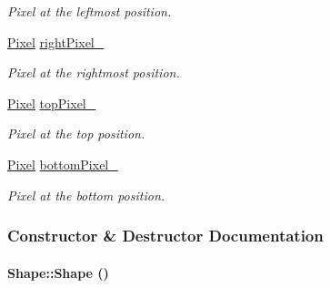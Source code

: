 \begin{CompactItemize}
\begin{CompactList}\small\item\em Pixel at the leftmost position. \item\end{CompactList}\item 
\hypertarget{class_shape_16adfccce492a7a0e34c5ade941c32fd}{
\hyperlink{_pixel_8hpp_535e59456e3e633842529cfa8ea103c4}{Pixel} \hyperlink{class_shape_16adfccce492a7a0e34c5ade941c32fd}{rightPixel\_\-}}
\label{class_shape_16adfccce492a7a0e34c5ade941c32fd}

\begin{CompactList}\small\item\em Pixel at the rightmost position. \item\end{CompactList}\item 
\hypertarget{class_shape_c6755e0dbd9d2eaf537e232fd003c918}{
\hyperlink{_pixel_8hpp_535e59456e3e633842529cfa8ea103c4}{Pixel} \hyperlink{class_shape_c6755e0dbd9d2eaf537e232fd003c918}{topPixel\_\-}}
\label{class_shape_c6755e0dbd9d2eaf537e232fd003c918}

\begin{CompactList}\small\item\em Pixel at the top position. \item\end{CompactList}\item 
\hypertarget{class_shape_8277820de6ff8da989a0659f4e5d82d1}{
\hyperlink{_pixel_8hpp_535e59456e3e633842529cfa8ea103c4}{Pixel} \hyperlink{class_shape_8277820de6ff8da989a0659f4e5d82d1}{bottomPixel\_\-}}
\label{class_shape_8277820de6ff8da989a0659f4e5d82d1}

\begin{CompactList}\small\item\em Pixel at the bottom position. \item\end{CompactList}\end{CompactItemize}


\subsubsection{Constructor \& Destructor Documentation}
\hypertarget{class_shape_aa8d87171e65e0d8ba3c5459978992a7}{
\paragraph[Shape]{\setlength{\rightskip}{0pt plus 5cm}Shape::Shape ()}\hfill}
\label{class_shape_aa8d87171e65e0d8ba3c5459978992a7}


